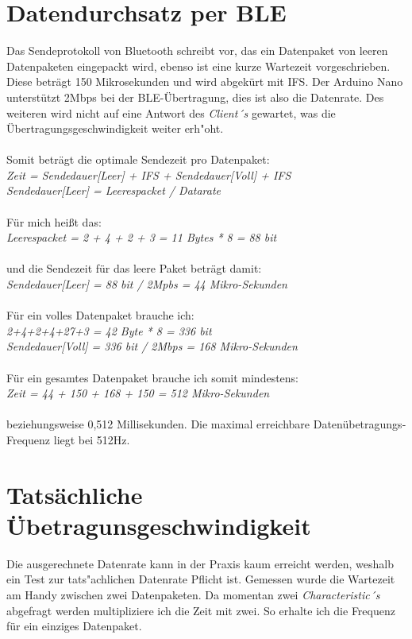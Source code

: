 \section{Datendurchsatz per BLE}

Das Sendeprotokoll von Bluetooth schreibt vor, das ein Datenpaket von
leeren Datenpaketen eingepackt wird, ebenso ist eine kurze Wartezeit vorgeschrieben. 
Diese beträgt 150 Mikrosekunden und wird abgekürt mit IFS.
Der Arduino Nano unterstützt 2Mbps bei der BLE-Übertragung, dies ist also die Datenrate.
Des weiteren wird nicht auf eine Antwort des \textit{Client´s} gewartet, was die 
Übertragungsgeschwindigkeit weiter erh"oht.\\
\\
Somit beträgt die optimale Sendezeit pro Datenpaket:\\
\textit{Zeit = Sendedauer[Leer] + IFS + Sendedauer[Voll] + IFS\\
Sendedauer[Leer] = Leerespacket / Datarate}\\
\\
Für mich heißt das:\\
\textit{Leerespacket = 2 + 4 + 2 + 3 = 11 Bytes * 8 = 88 bit}\\
\\
und die Sendezeit für das leere Paket beträgt damit:\\
\textit{Sendedauer[Leer] = 88 bit / 2Mpbs = 44 Mikro-Sekunden}\\
\\
Für ein volles Datenpaket brauche ich:\\
\textit{2+4+2+4+27+3 = 42 Byte * 8 = 336 bit\\
Sendedauer[Voll] = 336 bit / 2Mbps = 168 Mikro-Sekunden}\\
\\
Für ein gesamtes Datenpaket brauche ich somit mindestens:\\
\textit{Zeit = 44 + 150 + 168 + 150 = 512 Mikro-Sekunden}\\
\\
beziehungsweise 0,512 Millisekunden. Die maximal erreichbare Datenübetragungs-Frequenz
liegt bei 512Hz.


\section{Tatsächliche Übetragunsgeschwindigkeit}
Die ausgerechnete Datenrate kann in der Praxis kaum erreicht werden, weshalb ein Test zur 
tats"achlichen Datenrate Pflicht ist. Gemessen wurde die Wartezeit am Handy zwischen zwei
Datenpaketen. Da momentan zwei \textit{Characteristic´s} abgefragt werden multipliziere ich die 
Zeit mit zwei. So erhalte ich die Frequenz für ein einziges Datenpaket.
